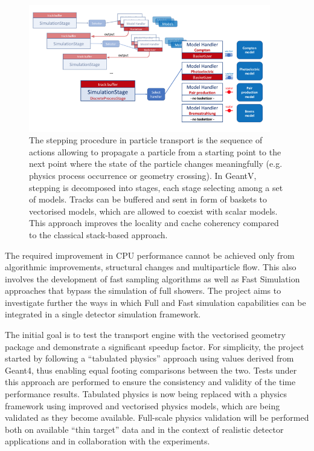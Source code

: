 \documentclass[12pt,a4paper]{article}
\begin{document}
{\begin{figure}[bthp]
\vspace*{0.3cm}
\centering
\includegraphics[width=0.94\textwidth]{image22.png}
\caption{The stepping procedure in particle transport is the
sequence of actions allowing to propagate a particle from a starting
point to the next point where the state of the particle changes
meaningfully (e.g. physics process occurrence or geometry crossing). In
GeantV, stepping is decomposed into stages, each stage selecting among a
set of models. Tracks can be buffered and sent in form of baskets to
vectorised models, which are allowed to coexist with scalar models. This
approach improves the locality and cache coherency compared to the
classical stack-based approach.}
\label{fig:parttransp}
\end{figure}

The required improvement in CPU performance cannot be achieved only from
algorithmic improvements, structural changes and multiparticle flow.
This also involves the development of fast sampling algorithms as well
as Fast Simulation approaches that bypass the simulation of full
showers. The project aims to investigate further the ways in which Full
and Fast simulation capabilities can be integrated in a single detector
simulation framework.

The initial goal is to test the transport engine with the vectorised
geometry package and demonstrate a significant speedup factor. For
simplicity, the project started by following a ``tabulated physics''
approach using values derived from Geant4, thus enabling equal footing
comparisons between the two. Tests under this approach are performed to
ensure the consistency and validity of the time performance results.
Tabulated physics is now being replaced with a physics framework using
improved and vectorised physics models, which are being validated as
they become available. Full-scale physics validation will be performed
both on available ``thin target'' data and in the context of realistic
detector applications and in collaboration with the experiments.

}
\end{document}
